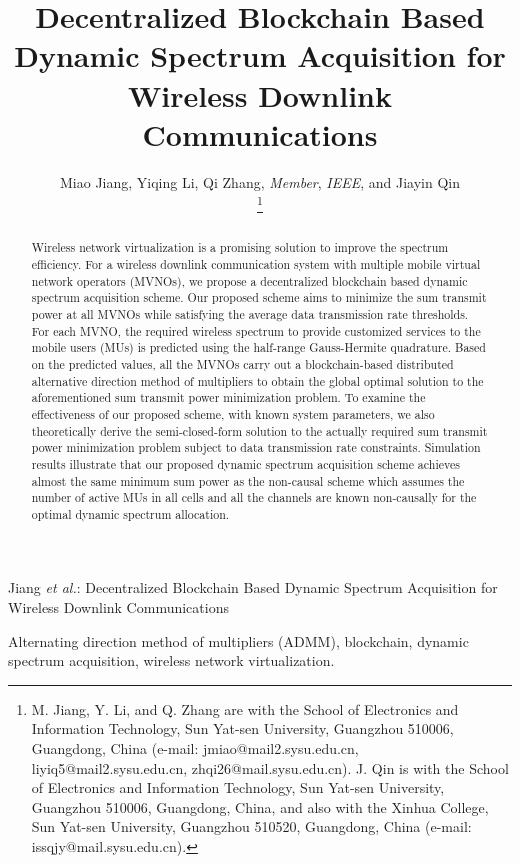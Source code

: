 \documentclass[journal]{IEEEtran}
\begin{document}
	
\title{Decentralized Blockchain Based Dynamic Spectrum Acquisition for Wireless Downlink Communications}
	
\author{Miao Jiang, Yiqing Li, Qi Zhang, \emph{Member}, \emph{IEEE}, and Jiayin Qin

\thanks{M. Jiang, Y. Li, and Q. Zhang are with the School of Electronics and Information Technology, Sun Yat-sen University, Guangzhou 510006, Guangdong, China (e-mail: jmiao@mail2.sysu.edu.cn, liyiq5@mail2.sysu.edu.cn, zhqi26@mail.sysu.edu.cn). J. Qin is with the School of Electronics and
Information Technology, Sun Yat-sen University, Guangzhou 510006, Guangdong,  China, and also with the Xinhua College, Sun Yat-sen University, Guangzhou 510520, Guangdong, China (e-mail: issqjy@mail.sysu.edu.cn).}
}%
	
	
\markboth{}
{Jiang \MakeLowercase{\textit{et al.}}: Decentralized Blockchain Based Dynamic Spectrum Acquisition for Wireless Downlink Communications}
	
\maketitle
\begin{abstract}
Wireless network virtualization is a promising solution to improve the spectrum efficiency. For a wireless downlink communication system with multiple mobile virtual network operators (MVNOs), we propose a decentralized blockchain based dynamic spectrum acquisition scheme. Our proposed scheme aims to minimize the sum transmit power at all MVNOs while satisfying the average data transmission rate thresholds. For each MVNO, the required wireless spectrum to provide customized services to the mobile users (MUs) is predicted using the half-range Gauss-Hermite quadrature. Based on the predicted values, all the MVNOs carry out a blockchain-based distributed alternative direction method of multipliers to obtain the global optimal solution to the aforementioned sum transmit power minimization problem. To examine the effectiveness of our proposed scheme, with known system parameters, we also theoretically derive the semi-closed-form solution to the {\color{red} actually} required sum transmit power minimization problem subject to data transmission rate constraints. Simulation results illustrate that our proposed dynamic spectrum acquisition scheme achieves almost the same minimum sum power as the non-causal scheme which assumes the number of active MUs in all cells and all the channels are known non-causally for the optimal dynamic spectrum allocation.
\end{abstract}
\begin{IEEEkeywords}
Alternating direction method of multipliers (ADMM), blockchain, dynamic spectrum acquisition, wireless network virtualization.
\end{IEEEkeywords}
\IEEEpeerreviewmaketitle
	
\end{document}
